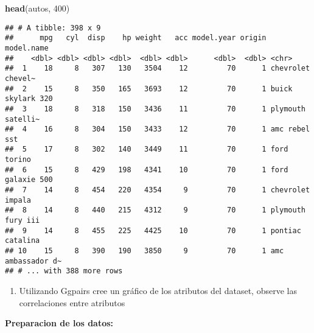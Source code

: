 \documentclass[]{article}
\newenvironment{Shaded}{\begin{snugshade}}{\end{snugshade}}
\newcommand{\DecValTok}[1]{\textcolor[rgb]{0.00,0.00,0.81}{#1}}
\newcommand{\KeywordTok}[1]{\textcolor[rgb]{0.13,0.29,0.53}{\textbf{#1}}}
\newcommand{\NormalTok}[1]{#1}
\providecommand{\tightlist}{%
  \setlength{\itemsep}{0pt}\setlength{\parskip}{0pt}}
\begin{document}
\begin{Shaded}
\begin{Highlighting}[]
\KeywordTok{head}\NormalTok{(autos, }\DecValTok{400}\NormalTok{)}
\end{Highlighting}
\end{Shaded}

\begin{verbatim}
## # A tibble: 398 x 9
##      mpg   cyl  disp    hp weight   acc model.year origin model.name       
##    <dbl> <dbl> <dbl> <dbl>  <dbl> <dbl>      <dbl>  <dbl> <chr>            
##  1    18     8   307   130   3504    12         70      1 chevrolet chevel~
##  2    15     8   350   165   3693    12         70      1 buick skylark 320
##  3    18     8   318   150   3436    11         70      1 plymouth satelli~
##  4    16     8   304   150   3433    12         70      1 amc rebel sst    
##  5    17     8   302   140   3449    11         70      1 ford torino      
##  6    15     8   429   198   4341    10         70      1 ford galaxie 500 
##  7    14     8   454   220   4354     9         70      1 chevrolet impala 
##  8    14     8   440   215   4312     9         70      1 plymouth fury iii
##  9    14     8   455   225   4425    10         70      1 pontiac catalina 
## 10    15     8   390   190   3850     9         70      1 amc ambassador d~
## # ... with 388 more rows
\end{verbatim}

\begin{enumerate}
\def\labelenumi{\arabic{enumi}.}
\setcounter{enumi}{1}
\tightlist
\item
  Utilizando Ggpairs cree un gráfico de los atributos del dataset,
  observe las correlaciones entre atributos
\end{enumerate}

\textbf{Preparacion de los datos:}
\end{document}
